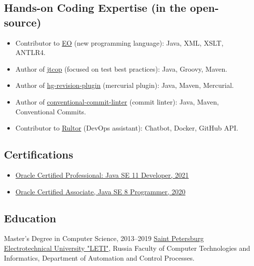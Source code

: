 \documentclass{vl}
\begin{document}
    \subsection*{Hands-on Coding Expertise (in the open-source)}
    \begin{itemize}
        \itemsep0em
        \item Contributor to \href{https://www.eolang.org}{EO} (new programming language):
        Java, XML, XSLT, ANTLR4.
        \item Author of  \href{https://github.com/volodya-lombrozo/jtcop}{jtcop} (focused on test best practices):
        Java, Groovy, Maven.
        \item Author of \href{https://github.com/volodya-lombrozo/hg-revision-plugin}{hg-revision-plugin}
        (mercurial plugin): Java, Maven, Mercurial.
        \item Author of
        \href{https://github.com/volodya-lombrozo/conventional-commit-linter}{conventional-commit-linter}
        (commit linter): Java, Maven, Conventional Commits.
        \item Contributor to \href{https://www.rultor.com}{Rultor} (DevOps assistant): Chatbot, Docker, GitHub API.
    \end{itemize}

    \subsection*{Certifications}

    \begin{itemize}
        \itemsep0em
        \item \href{https://catalog-education.oracle.com/pls/certview/sharebadge?id=87F6A2FE819A5A5AF4120A05900AB28A461EE9A3EE9FBFA02721FADAEB3BCE19}{Oracle Certified Professional: Java SE 11 Developer, 2021}
        \item \href{https://www.credly.com/badges/e2d9ddda-20dc-433d-8ab7-18548fd0fd8f/public_url}{Oracle Certified Associate, Java SE 8 Programmer, 2020}
    \end{itemize}

    \subsection*{Education}

    \begin{samepage}
        Master's Degree in Computer Science, 2013--2019\newline
        \href{https://etu.ru/en/university/}{Saint Petersburg Electrotechnical University "LETI"}, Russia\newline
        Faculty of Computer Technologies and Informatics, Department of Automation and Control Processes.
    \end{samepage}
\end{document}
